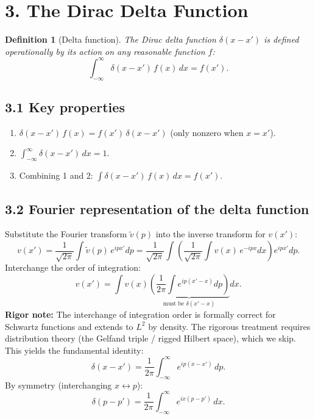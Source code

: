 \documentclass[12pt,a4paper]{article}
\newtheorem{definition}{Definition}
\begin{document}
\section{3. The Dirac Delta Function}

\begin{definition}[Delta function]
The Dirac delta function $\delta(x-x')$ is defined operationally by its action on any reasonable function $f$:
\[
    \int_{-\infty}^{\infty} \delta(x-x')\,f(x)\,dx = f(x').
\]
\end{definition}

\subsection{3.1 Key properties}
\begin{enumerate}[nosep]
    \item $\delta(x-x')\,f(x) = f(x')\,\delta(x-x')$ \quad (only nonzero when $x=x'$).
    \item $\displaystyle\int_{-\infty}^{\infty}\delta(x-x')\,dx = 1$.
    \item Combining 1 and 2: $\displaystyle\int \delta(x-x')\,f(x)\,dx = f(x')$.
\end{enumerate}

\subsection{3.2 Fourier representation of the delta function}
Substitute the Fourier transform $\tilde{v}(p)$ into the inverse transform for $v(x')$:
\[
    v(x') = \frac{1}{\sqrt{2\pi}}\int \tilde{v}(p)\,e^{ipx'}dp
    = \frac{1}{\sqrt{2\pi}}\int\left(\frac{1}{\sqrt{2\pi}}\int v(x)\,e^{-ipx}dx\right)e^{ipx'}dp.
\]
Interchange the order of integration:
\[
    v(x') = \int v(x)\underbrace{\left(\frac{1}{2\pi}\int e^{ip(x'-x)}dp\right)}_{\text{must be }\delta(x'-x)}dx.
\]
\noindent\textbf{Rigor note:} The interchange of integration order is formally correct for Schwartz functions and extends to $L^2$ by density.  The rigorous treatment requires distribution theory (the Gelfand triple / rigged Hilbert space), which we skip.
This yields the fundamental identity:
\[
    \boxed{\delta(x-x') = \frac{1}{2\pi}\int_{-\infty}^{\infty} e^{ip(x-x')}\,dp.}
\]
By symmetry (interchanging $x\leftrightarrow p$):
\[
    \delta(p-p') = \frac{1}{2\pi}\int_{-\infty}^{\infty} e^{ix(p-p')}\,dx.
\]
\end{document}
